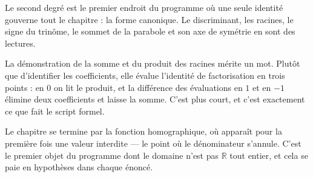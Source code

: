 Le second degré est le premier endroit du programme où une seule identité gouverne tout le
chapitre : la forme canonique. Le discriminant, les racines, le signe du trinôme, le sommet
de la parabole et son axe de symétrie en sont des lectures.

La démonstration de la somme et du produit des racines mérite un mot. Plutôt que d'identifier
les coefficients, elle évalue l'identité de factorisation en trois points : en $0$ on lit le
produit, et la différence des évaluations en $1$ et en $-1$ élimine deux coefficients et
laisse la somme. C'est plus court, et c'est exactement ce que fait le script formel.

Le chapitre se termine par la fonction homographique, où apparaît pour la première fois une
valeur interdite — le point où le dénominateur s'annule. C'est le premier objet du programme
dont le domaine n'est pas $\mathbb{R}$ tout entier, et cela se paie en hypothèses dans chaque
énoncé.
